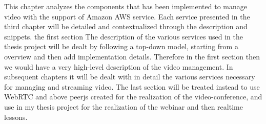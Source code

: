 This chapter analyzes the components that has been implemented to manage video with the support of Amazon AWS service.
Each service presented in the third chapter will be detailed and contextualized through the description and snippets. 
the first section The description of the various services used in the thesis project will be dealt by following a top-down model, starting from a overview and then add implementation details.
Therefore in the first section then we would have a very high-level description of the video management.
In subsequent chapters it will be dealt with in detail the various services necessary for managing and streaming video.
The last section will be treated instead to use WebRTC and above peerjs created for the realization of the video-conference, and use in my thesis project for the realization of the webinar and then realtime lessons.